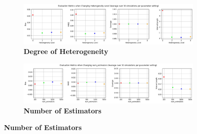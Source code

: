 \documentclass[12pt]{article}
\begin{document}
\begin{figure}
\ContinuedFloat
	\begin{subfigure} [!ht] {\linewidth}
		\caption{\label{figure:sixe}\textbf{Degree of Heterogeneity}}
   	 	\includegraphics[width = \linewidth]{Graphs/s2_hetero.png}
	\end{subfigure}
	\begin{subfigure} [!ht] {\linewidth}
\vspace{0.5cm}
		\caption{\label{figure:sixf}\textbf{Number of Estimators}}
   	 	\includegraphics[width = \linewidth]{Graphs/s2_nestimator.png}
	\end{subfigure}
\end{figure} 
\end{document}
